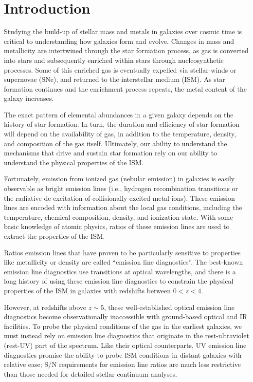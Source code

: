 \documentclass[preprint2]{aastex62}
\begin{document}
\section{Introduction} \label{sec:intro}

Studying the build-up of stellar mass and metals in galaxies over cosmic time is critical to understanding how galaxies form and evolve. Changes in mass and metallicity are intertwined through the star formation process, as gas is converted into stars and subsequently enriched within stars through nucleosynthetic processes. Some of this enriched gas is eventually expelled via stellar winds or supernovae (SNe), and returned to the interstellar medium (ISM). As star formation continues and the enrichment process repeats, the metal content of the galaxy increases.

The exact pattern of elemental abundances in a given galaxy depends on the history of star formation. In turn, the duration and efficiency of star formation will depend on the availability of gas, in addition to the temperature, density, and composition of the gas itself. Ultimately, our ability to understand the mechanisms that drive and sustain star formation rely on our ability to understand the physical properties of the ISM.

Fortunately, emission from ionized gas (nebular emission) in galaxies is easily observable as bright emission lines (i.e., hydrogen recombination transitions or the radiative de-excitation of collisionally excited metal ions). These emission lines are encoded with information about the local gas conditions, including the temperature, chemical composition, density, and ionization state. With some basic knowledge of atomic physics, ratios of these emission lines are used to extract the properties of the ISM.

Ratios emission lines that have proven to be particularly sensitive to properties like metallicity or density are called ``emission line diagnostics''. The best-known emission line diagnostics use transitions at optical wavelengths, and there is a long history of using these emission line diagnostics to constrain the physical properties of the ISM in galaxies with redshifts between $0<z<4$.

However, at redshifts above $z{\sim}5$, these well-established optical emission line diagnostics become observationally inaccessible with ground-based optical and IR facilities. To probe the physical conditions of the gas in the earliest galaxies, we must instead rely on emission line diagnostics that originate in the rest-ultraviolet (rest-UV) part of the spectrum. Like their optical counterparts, UV emission line diagnostics promise the ability to probe ISM conditions in distant galaxies with relative ease; S/N requirements for emission line ratios are much less restrictive than those needed for detailed stellar continuum analyses.
\end{document}

